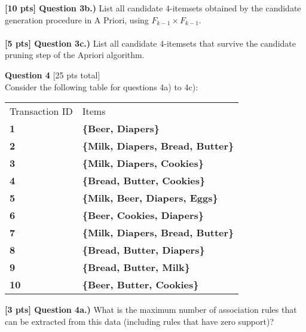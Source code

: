 \documentclass[paper=a4, fontsize=11pt]{scrartcl} %
\begin{document}
\textbf{[10 pts] Question 3b.)} List all candidate 4-itemsets obtained by the candidate generation procedure in A Priori, using $F_{k-1} \times F_{k-1}$. \\
\\

\textbf{[5 pts] Question 3c.)} List all candidate 4-itemsets that survive the candidate pruning step of
the Apriori algorithm. \\

\vspace{10mm}

{\Large \textbf{Question 4} [25 pts total]} \\
 
Consider the following table for questions 4a) to 4c):\\
\begin{center}
\begin{tabular}{ll}
Transaction ID & Items \\
\rowcolor[HTML]{DEEBF6} 
\textbf{1}     & \textbf{\{Beer, Diapers\}} \\
\rowcolor[HTML]{DEEBF6} 
\textbf{2}     & \textbf{\{Milk, Diapers, Bread, Butter\}} \\
\rowcolor[HTML]{DEEBF6} 
\textbf{3}     & \textbf{\{Milk, Diapers, Cookies\}} \\
\rowcolor[HTML]{DEEBF6} 
\textbf{4}     & \textbf{\{Bread, Butter, Cookies\}} \\
\rowcolor[HTML]{DEEBF6} 
\textbf{5}     & \textbf{\{Milk, Beer, Diapers, Eggs\}} \\
\rowcolor[HTML]{DEEBF6} 
\textbf{6}     & \textbf{\{Beer, Cookies, Diapers\}} \\
\rowcolor[HTML]{DEEBF6} 
\textbf{7}     & \textbf{\{Milk, Diapers, Bread, Butter\}} \\
\rowcolor[HTML]{DEEBF6} 
\textbf{8}     & \textbf{\{Bread, Butter, Diapers\}} \\
\rowcolor[HTML]{DEEBF6} 
\textbf{9}     & \textbf{\{Bread, Butter, Milk\}} \\
\rowcolor[HTML]{DEEBF6} 
\textbf{10}    & \textbf{\{Beer, Butter, Cookies\}}    
\end{tabular}
\end{center}

\vspace{8mm}

\textbf{[3 pts] Question 4a.)} What is the maximum number of association rules that can be extracted from this data (including rules that have zero support)? \\
\end{document}
